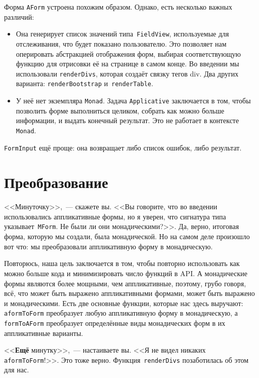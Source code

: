 Форма \lstinline'AForm' устроена похожим образом. Однако, есть несколько важных различий:
\begin{itemize}
    \item Она генерирует список значений типа~\lstinline'FieldView',
        используемые для отслеживания, что будет показано пользователю. Это
        позволяет нам оперировать абстракцией отображения форм, выбирая
        соответствующую функцию для отрисовки её на странице в самом конце. Во
        введении мы использовали \lstinline'renderDivs', которая создаёт связку
        тегов div. Два других варианта: \lstinline'renderBootstrap'
        и~\lstinline'renderTable'.

    \item У неё нет экземпляра \lstinline'Monad'. Задача
        \lstinline'Applicative' заключается в том, чтобы позволить форме
        выполниться целиком, собрать как можно больше информации, и выдать
        конечный результат. Это не работает в контексте \lstinline'Monad'.
\end{itemize}

\lstinline'FormInput' ещё проще: она возвращает либо список ошибок, либо результат.

\section{Преобразование}
<<Минуточку>>,~--- скажете вы. <<Вы говорите, что во введении использовались
аппликативные формы, но я уверен, что сигнатура типа
указывает~\lstinline'MForm'. Не были ли они монадическими?>>. Да, верно,
итоговая форма, которую мы создали, была монадической. Но на самом деле
произошло вот что: мы преобразовали аппликативную форму в монадическую.

Повторюсь, наша цель заключается в том, чтобы повторно использовать как можно
больше кода и минимизировать число функций в API. А монадические формы
являются более мощными, чем аппликативные, поэтому, грубо говоря, всё, что
может быть выражено аппликативными формами, может быть выражено и
монадическими. Есть две основные функции, которые нас здесь выручают:
\lstinline'aformToForm' преобразует любую аппликативную форму в монадическую,
а \lstinline'formToAForm' преобразует определённые виды монадических форм в их
аппликативные варианты.

<<\textbf{Ещё} минутку>>,~--- настаиваете вы. <<Я не видел никаких
\lstinline'aformToForm'!>>. Это тоже верно.  Функция~\lstinline'renderDivs'
позаботилась об этом для нас.

